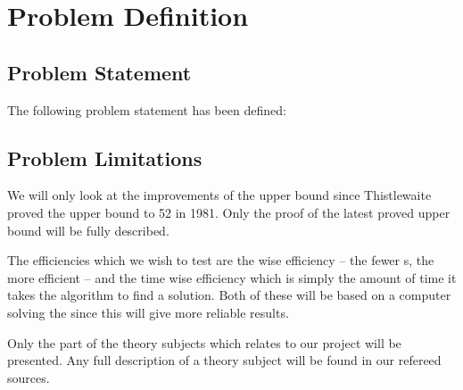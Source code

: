 \chapter{Problem Definition}
\emptyTop{}

\section{Problem Statement}
The following problem statement has been defined:




\section{Problem Limitations}
\label{sec:problemLimitations}
We will only look at the improvements of the upper bound since Thistlewaite proved the upper bound to 52 in 1981\cite{knowledgerush2}. Only the proof of the latest proved upper bound will be fully described. 

The efficiencies which we wish to test are the \twist{} wise efficiency -- the fewer \twist{}s, the more efficient -- and the time wise efficiency which is simply the amount of time it takes the algorithm to find a solution.
Both of these will be based on a computer solving the \rubik{} since this will give more reliable results.


Only the part of the theory subjects which relates to our project will be presented. Any full description of a theory subject will be found in our refereed sources.